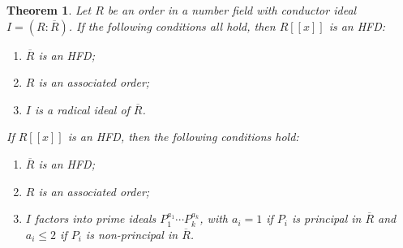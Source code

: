 \documentclass[12pt]{amsart}
\newtheorem{theorem}{Theorem}[section]
\theoremstyle{definition}
\newcommand{\Rbar}{{\overline{R}}}
\begin{document}
\begin{theorem}
    \label{HFD power series over order}
    Let $R$ be an order in a number field with conductor ideal $I=(R:\Rbar)$. If the following conditions all hold, then $R[[x]]$ is an HFD:
    \begin{enumerate}
        \item $\Rbar$ is an HFD;
        \item $R$ is an associated order;
        \item $I$ is a radical ideal of $\Rbar$.
    \end{enumerate}
    If $R[[x]]$ is an HFD, then the following conditions hold:
    \begin{enumerate}
        \item $\Rbar$ is an HFD;
        \item $R$ is an associated order;
        \item $I$ factors into prime ideals $P_1^{a_1}\cdots P_k^{a_k}$, with $a_i=1$ if $P_i$ is principal in $\Rbar$ and $a_i\leq 2$ if $P_i$ is non-principal in $\Rbar$.
    \end{enumerate}
\end{theorem}
\end{document}
